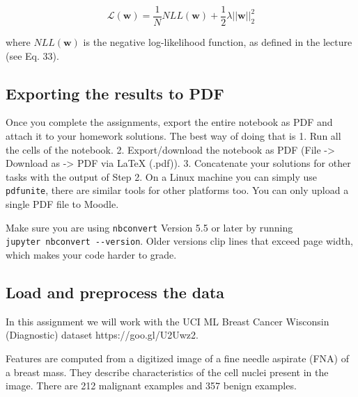 \documentclass[11pt]{article}
\begin{document}
\[\mathcal{L}(\mathbf{w}) = \frac{1}{N} NLL(\mathbf{w}) +  \frac{1}{2}\lambda ||\mathbf{w}||^2_2\]

where \(NLL(\mathbf{w})\) is the negative log-likelihood function, as
defined in the lecture (see Eq. 33).

    \hypertarget{exporting-the-results-to-pdf}{%
\subsection{Exporting the results to
PDF}\label{exporting-the-results-to-pdf}}

    Once you complete the assignments, export the entire notebook as PDF and
attach it to your homework solutions. The best way of doing that is 1.
Run all the cells of the notebook. 2. Export/download the notebook as
PDF (File -\textgreater{} Download as -\textgreater{} PDF via LaTeX
(.pdf)). 3. Concatenate your solutions for other tasks with the output
of Step 2. On a Linux machine you can simply use \texttt{pdfunite},
there are similar tools for other platforms too. You can only upload a
single PDF file to Moodle.

Make sure you are using \texttt{nbconvert} Version 5.5 or later by
running \texttt{jupyter\ nbconvert\ -\/-version}. Older versions clip
lines that exceed page width, which makes your code harder to grade.

    \hypertarget{load-and-preprocess-the-data}{%
\subsection{Load and preprocess the
data}\label{load-and-preprocess-the-data}}

    In this assignment we will work with the UCI ML Breast Cancer Wisconsin
(Diagnostic) dataset https://goo.gl/U2Uwz2.

Features are computed from a digitized image of a fine needle aspirate
(FNA) of a breast mass. They describe characteristics of the cell nuclei
present in the image. There are 212 malignant examples and 357 benign
examples.
\end{document}
